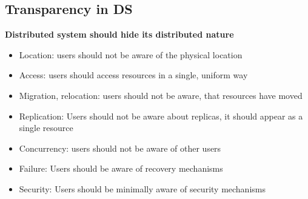\subsection{Transparency in DS}
\textbf{Distributed system should hide its distributed nature}
\begin{itemize}
    \item Location: users should not be aware of the physical location
    \item Access: users should access resources in a single, uniform way
    \item Migration, relocation: users should not be aware, that resources have moved
    \item Replication: Users should not be aware about replicas, it should appear as a single resource
    \item Concurrency: users should not be aware of other users
    \item Failure: Users should be aware of recovery mechanisms
    \item Security: Users should be minimally aware of security mechanisms
\end{itemize}